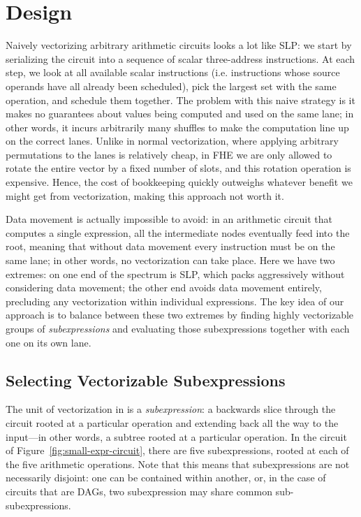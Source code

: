 \section{Design}\label{sec:design}
Naively vectorizing arbitrary arithmetic circuits looks a lot like SLP: we start by serializing the circuit into a sequence of scalar three-address instructions.
At each step, we look at all available scalar instructions (i.e. instructions whose source operands have all already been scheduled), pick the largest set with the same operation, and schedule them together.
The problem with this naive strategy is it makes no guarantees about values being computed and used on the same lane; in other words, it incurs arbitrarily many shuffles to make the computation line up on the correct lanes.
Unlike in normal vectorization, where applying arbitrary permutations to the lanes is relatively cheap, in FHE we are only allowed to rotate the entire vector by a fixed number of slots, and this rotation operation is expensive.
Hence, the cost of bookkeeping quickly outweighs whatever benefit we might get from vectorization, making this approach not worth it.

Data movement is actually impossible to avoid: in an arithmetic circuit that computes a single expression, all the intermediate nodes eventually feed into the root, meaning that without data movement every instruction must be on the same lane; in other words, no vectorization can take place.
Here we have two extremes: on one end of the spectrum is SLP, which packs aggressively without considering data movement; the other end avoids data movement entirely, precluding any vectorization within individual expressions.
The key idea of our approach is to balance between these two extremes by finding highly vectorizable groups of {\em subexpressions} and evaluating those subexpressions together with each one on its own lane.
\subsection{Selecting Vectorizable Subexpressions}\label{sec:selecting-subexpressions}

The unit of vectorization in \system is a \textit{subexpression}: a backwards slice through the circuit rooted at a particular operation and extending back all the way to the input---in other words, a subtree rooted at a particular operation. In the circuit of Figure~\ref{fig:small-expr-circuit}, there are five subexpressions, rooted at each of the five arithmetic operations. Note that this means that subexpressions are not necessarily disjoint: one can be contained within another, or, in the case of circuits that are DAGs, two subexpression may share common sub-subexpressions.

